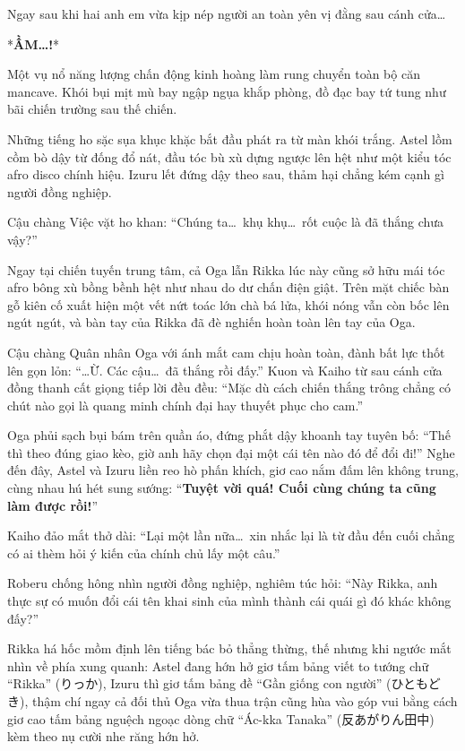 \documentclass[../main.tex]{subfiles}
\begin{document}
Ngay sau khi hai anh em vừa kịp nép người an toàn yên vị đằng sau cánh cửa\dots

*\textbf{ẦM\dots!}*

Một vụ nổ năng lượng chấn động kinh hoàng làm rung chuyển toàn bộ căn mancave. Khói bụi mịt mù bay ngập ngụa khắp phòng, đồ đạc bay tứ tung như bãi chiến trường sau thế chiến.

Những tiếng ho sặc sụa khục khặc bắt đầu phát ra từ màn khói trắng. Astel lồm cồm bò dậy từ đống đổ nát, đầu tóc bù xù dựng ngược lên hệt như một kiểu tóc afro disco chính hiệu. Izuru lết đứng dậy theo sau, thảm hại chẳng kém cạnh gì người đồng nghiệp.


Cậu chàng Việc vặt ho khan: ``Chúng ta\dots\ khụ khụ\dots\ rốt cuộc là đã thắng chưa vậy?''

Ngay tại chiến tuyến trung tâm, cả Oga lẫn Rikka lúc này cũng sở hữu mái tóc afro bông xù bồng bềnh hệt như nhau do dư chấn điện giật. Trên mặt chiếc bàn gỗ kiên cố xuất hiện một vết nứt toác lớn chà bá lửa, khói nóng vẫn còn bốc lên ngút ngút, và bàn tay của Rikka đã đè nghiến hoàn toàn lên tay của Oga.


Cậu chàng Quân nhân Oga với ánh mắt cam chịu hoàn toàn, đành bất lực thốt lên gọn lỏn: ``\dots Ừ. Các cậu\dots\ đã thắng rồi đấy.'' Kuon và Kaiho từ sau cánh cửa đồng thanh cất giọng tiếp lời đều đều: ``Mặc dù cách chiến thắng trông chẳng có chút nào gọi là quang minh chính đại hay thuyết phục cho cam.''

Oga phủi sạch bụi bám trên quần áo, đứng phắt dậy khoanh tay tuyên bố: ``Thế thì theo đúng giao kèo, giờ anh hãy chọn đại một cái tên nào đó để đổi đi!'' Nghe đến đây, Astel và Izuru liền reo hò phấn khích, giơ cao nắm đấm lên không trung, cùng nhau hú hét sung sướng: ``\textbf{Tuyệt vời quá! Cuối cùng chúng ta cũng làm được rồi!}''

Kaiho đảo mắt thở dài: ``Lại một lần nữa\dots\ xin nhắc lại là từ đầu đến cuối chẳng có ai thèm hỏi ý kiến của chính chủ lấy một câu.''

Roberu chống hông nhìn người đồng nghiệp, nghiêm túc hỏi: ``Này Rikka, anh thực sự có muốn đổi cái tên khai sinh của mình thành cái quái gì đó khác không đấy?''

Rikka há hốc mồm định lên tiếng bác bỏ thẳng thừng, thế nhưng khi ngước mắt nhìn về phía xung quanh: Astel đang hớn hở giơ tấm bảng viết to tướng chữ ``Rikka'' (りっか), Izuru thì giơ tấm bảng đề ``Gần giống con người'' (ひともどき), thậm chí ngay cả đối thủ Oga vừa thua trận cũng hùa vào góp vui bằng cách giơ cao tấm bảng nguệch ngoạc dòng chữ ``Ác-kka Tanaka'' (反あがりん田中) kèm theo nụ cười nhe răng hớn hở.
\end{document}
